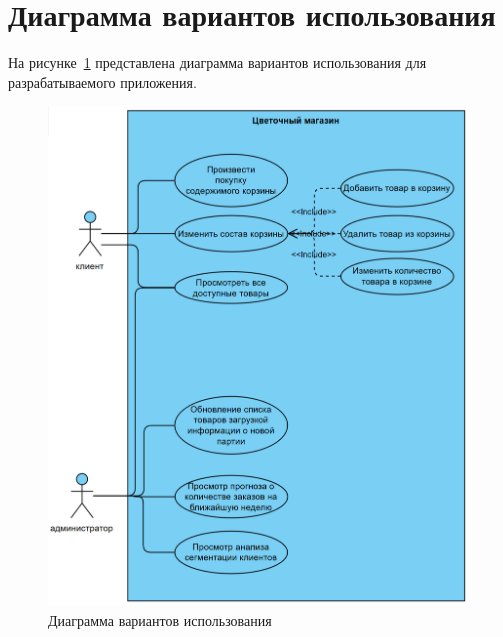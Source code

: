 \section{Диаграмма вариантов использования}
На рисунке~\ref{fig:UseCase} представлена диаграмма вариантов использования для разрабатываемого приложения.
\begin{figure}
	\centering
	\includegraphics[width=1\linewidth]{pictures/use_case}
	\caption{Диаграмма вариантов использования}
	\label{fig:UseCase}
\end{figure}



